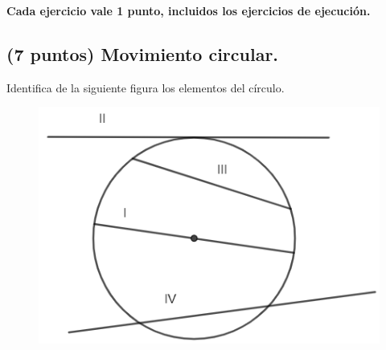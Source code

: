 \documentclass[12pt, letter]{exam}
\begin{document}


\setcounter{page}{3}

\begin{center}
\textbf{Cada ejercicio vale 1 punto, incluidos los ejercicios de ejecución.}
\end{center}

\begin{questions}
    \section{(7 puntos) Movimiento circular.}

    \question Identifica de la siguiente figura los elementos del círculo.
    \begin{figure}[H]
        \centering
        \includegraphics[scale=1]{Elementos_Circulo_02.png}
    \end{figure}
    \begin{multicols}{2}
\end{multicols}
\end{questions}
\end{document}
